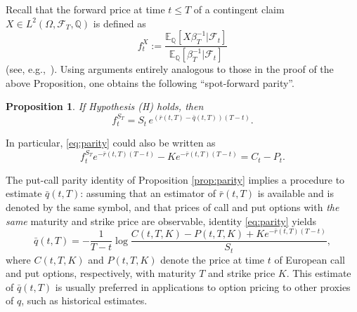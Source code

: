 \documentclass[11pt]{article}
\newtheorem{prop}{Proposition}[section]
\theoremstyle{remark}
\newcommand{\E}{\mathbb{E}}
\newcommand{\cF}{\mathcal{F}}
\newcommand{\Q}{\mathbb{Q}}
\begin{document}
Recall that the forward price at time $t \leq T$ of a contingent claim
$X \in L^2(\Omega,\cF_T,\Q)$ is defined as
\[
f_t^X := \frac{\E_\Q[X\beta_T^{-1} \vert \cF_t]}%
             {\E_\Q[\beta_T^{-1} \vert \cF_t]}
\]
(see, e.g.,~\cite[{\S}2.4]{KS-mmf}).
%
Using arguments entirely analogous to those in the proof of the above
Proposition, one obtains the following ``spot-forward parity''.
%
\begin{prop}
  If Hypothesis \emph{(H)} holds, then
  \[
  f_t^{S_T} = S_t \, e^{(\bar{r}(t,T)-\bar{q}(t,T))(T-t)}.
  \]
\end{prop}
%
In particular, \eqref{eq:parity} could also be written as
\[
f^{S_T}_t e^{-\bar{r}(t,T)(T-t)} - K e^{-\bar{r}(t,T)(T-t)} = C_t -
P_t.
\]

\medskip

The put-call parity identity of Proposition \ref{prop:parity} implies
a procedure to estimate $\bar{q}(t,T)$: assuming that an estimator of
$\bar{r}(t,T)$ is available and is denoted by the same symbol, and
that prices of call and put options with \emph{the same} maturity and
strike price are observable, identity \eqref{eq:parity} yields
\begin{equation}
\label{eq:qest}
\bar{q}(t,T) = -\frac{1}{T-t} 
\log \frac{C(t,T,K) - P(t,T,K) + Ke^{-\bar{r}(t,T)(T-t)}}{S_t},
\end{equation}
where $C(t,T,K)$ and $P(t,T,K)$ denote the price at time $t$ of
European call and put options, respectively, with maturity $T$ and
strike price $K$. This estimate of $\bar{q}(t,T)$ is usually preferred
in applications to option pricing to other proxies of $q$, such as
historical estimates.


\end{document}
